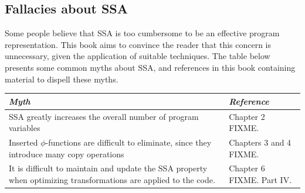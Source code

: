 \subsection{Fallacies about SSA}

Some people believe that SSA is too cumbersome to be an effective
program representation. 
This book aims to convince the reader that this concern is
unnecessary,
given the application of suitable techniques.
The table below presents some common myths
about SSA,
and references in this book containing material to dispell
these myths.

\begin{tabular}{p{6cm}|p{6cm}}
\emph{Myth} & \emph{Reference} \\ \hline
SSA greatly increases the overall number of program variables &
Chapter 2 FIXME. \\
Inserted $\phi$-functions are difficult to eliminate, since they
introduce many copy operations & Chapters 3 and 4 FIXME. \\
It is difficult to maintain and update the SSA property when
optimizing
transformations are applied to the code. & Chapter 6 FIXME. Part IV.\\
\end{tabular}



